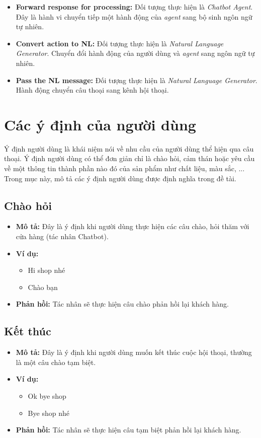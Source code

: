 \begin{itemize}
\begin{itemize}
        \item \textbf{Forward response for processing:} Đối tượng thực hiện là \textit{Chatbot Agent}. Đây là hành vi chuyển tiếp một hành động của \textit{agent} sang bộ sinh ngôn ngữ tự nhiên.
        \item \textbf{Convert action to NL:} Đối tượng thực hiện là \textit{Natural Language Generator}. Chuyển đổi hành động của người dùng và \textit{agent} sang ngôn ngữ tự nhiên.
        \item \textbf{Pass the NL message:} Đối tượng thực hiện là \textit{Natural Language Generator}. Hành động chuyển câu thoại sang kênh hội thoại.
    \end{itemize}
\end{itemize}

\section{Các ý định của người dùng}
Ý định người dùng là khái niệm nói về nhu cầu của người dùng thể hiện qua câu thoại. Ý định người dùng có thể đơn giản chỉ là chào hỏi, cảm thán hoặc yêu cầu về một thông tin thành phần nào đó của sản phẩm như chất liệu, màu sắc, ... Trong mục này, mô tả các ý định người dùng được định nghĩa trong đề tài.

\subsection{Chào hỏi}
\begin{itemize}
    \item \textbf{Mô tả:} Đây là ý định khi người dùng thực hiện các câu chào, hỏi thăm với cửa hàng (tác nhân Chatbot).
    \item \textbf{Ví dụ:}
    \begin{itemize}
        \item Hi shop nhé
        \item Chào bạn
    \end{itemize}
    \item \textbf{Phản hồi:} Tác nhân sẽ thực hiện câu chào phản hồi lại khách hàng.
\end{itemize}

\subsection{Kết thúc}
\begin{itemize}
    \item \textbf{Mô tả:} Đây là ý định khi người dùng muốn kết thúc cuộc hội thoại, thường là một câu chào tạm biệt.
    \item \textbf{Ví dụ:}
    \begin{itemize}
        \item Ok bye shop
        \item Bye shop nhé
    \end{itemize}
    \item \textbf{Phản hồi:} Tác nhân sẽ thực hiện câu tạm biệt phản hồi lại khách hàng.
\end{itemize}

